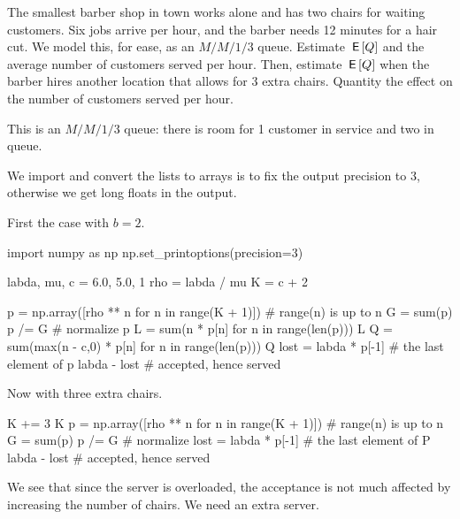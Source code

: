 \documentclass[queueing-book.tex]{subfiles}
\begin{document}
\begin{exercise} The smallest barber shop in town works alone and has two chairs for waiting customers.
 Six jobs arrive per hour, and the barber needs 12 minutes for a hair cut. We model this, for ease, as an $M/M/1/3$ queue.
 Estimate $\,\mathsf{E}\left[Q\right]$ and the average number of customers served per hour.
 Then, estimate $\,\mathsf{E}\left[Q\right]$ when the barber hires another location that allows for 3 extra chairs.
 Quantity the effect on the number of customers served per hour.
\begin{solution}
This is an $M/M/1/3$ queue: there is room for 1 customer in service and two in queue.

We import  and convert the lists to arrays is to fix the output precision to 3, otherwise we get long floats in the output.

First the case with $b=2$.
\begin{pyconsole}[barber]
import numpy as np
np.set_printoptions(precision=3)

labda, mu, c = 6.0,  5.0, 1
rho = labda / mu
K = c + 2


p = np.array([rho ** n for n in range(K + 1)]) # range(n) is up to n
G = sum(p)
p /= G  # normalize
p
L = sum(n * p[n] for n in range(len(p)))
L
Q = sum(max(n - c,0) * p[n] for n in range(len(p)))
Q
lost = labda * p[-1]  # the last element of p
labda - lost # accepted, hence served
\end{pyconsole}

Now with three extra chairs.

\begin{pyconsole}[barber]
K += 3
K
p = np.array([rho ** n for n in range(K + 1)]) # range(n) is up to n
G = sum(p)
p /= G  # normalize
lost = labda * p[-1]  # the last element of P
labda - lost # accepted, hence served
\end{pyconsole}
We see that since the server is overloaded, the acceptance is not much affected by increasing the number of chairs.
We need an extra server.
\end{solution}
\end{exercise}
\end{document}
